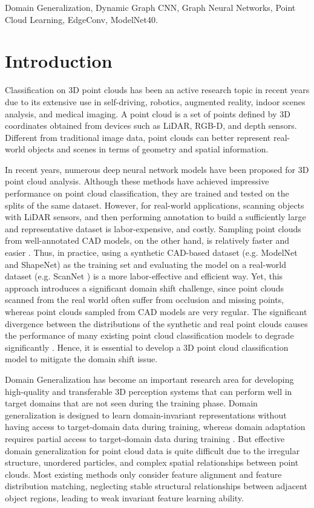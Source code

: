 \documentclass[conference]{IEEEtran}
\begin{document}
\begin{IEEEkeywords}
Domain Generalization, Dynamic Graph CNN, Graph Neural Networks, Point Cloud Learning, EdgeConv, ModelNet40.
\end{IEEEkeywords}

\section{Introduction}
Classification on 3D point clouds has been an active research topic in recent years due to its extensive use in self-driving, robotics, augmented reality, indoor scenes analysis, and medical imaging. A point cloud is a set of points defined by 3D coordinates obtained from devices such as LiDAR, RGB-D, and depth sensors. Different from traditional image data, point clouds can better represent real-world objects and scenes in terms of geometry and spatial information.

In recent years, numerous deep neural network models have been proposed for 3D point cloud analysis. Although these methods have achieved impressive performance on point cloud classification, they are trained and tested on the splits of the same dataset. However, for real-world applications, scanning objects with LiDAR sensors, and then performing annotation to build a sufficiently large and representative dataset is labor-expensive, and costly. Sampling point clouds from well-annotated CAD models, on the other hand, is relatively faster and easier \cite{wu20153d}. Thus, in practice, using a synthetic CAD-based dataset (e.g. ModelNet and ShapeNet) as the training set and evaluating the model on a real-world dataset (e.g. ScanNet \cite{dai2017scannet}) is a more labor-effective and efficient way. Yet, this approach introduces a significant domain shift challenge, since point clouds scanned from the real world often suffer from occlusion and missing points, whereas point clouds sampled from CAD models are very regular. The significant divergence between the distributions of the synthetic and real point clouds causes the performance of many existing point cloud classification models to degrade significantly \cite{ren2025dgmvp}. Hence, it is essential to develop a 3D point cloud classification model to mitigate the domain shift issue.

Domain Generalization has become an important research area for developing high-quality and transferable 3D perception systems that can perform well in target domains that are not seen during the training phase. Domain generalization is designed to learn domain-invariant representations without having access to target-domain data during training, whereas domain adaptation requires partial access to target-domain data during training \cite{qin2019pointdan}. But effective domain generalization for point cloud data is quite difficult due to the irregular structure, unordered particles, and complex spatial relationships between point clouds. Most existing methods only consider feature alignment and feature distribution matching, neglecting stable structural relationships between adjacent object regions, leading to weak invariant feature learning ability.
\end{document}
